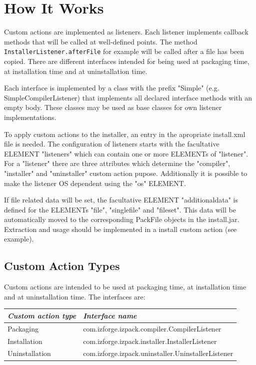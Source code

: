 \section{How It Works}

Custom actions are implemented as listeners. Each listener implements
callback methods that will be called at well-defined points. The method
\texttt{InstallerListener.afterFile} for example will be called after
a file has been copied. There are different interfaces intended for being
used at packaging time, at installation time and at uninstallation time.

Each interface is implemented by a class with the prefix
"Simple" (e.g. SimpleCompilerListener) that implements all declared interface
methods with an empty body. These classes may be used as base classes
for own listener implementations.

To apply custom actions to the installer, an entry in the apropriate
install.xml file is needed. The configuration of listeners starts with
the facultative ELEMENT "listeners" which can contain one or more ELEMENTs
of "listener". For a "listener" there are three attributes which determine the
"compiler", "installer" and "uninstaller" custom action pupose.
Additionally it is possible to make the listener OS dependent using the "os"
ELEMENT.

If file related data will be set, the facultative ELEMENT
"additionaldata" is defined for the ELEMENTs "file", "singlefile"
and "fileset". This data will be automatically moved to the
corresponding PackFile objects in the install.jar. Extraction and
usage should be implemented in a install custom action (see
example).




\subsection{Custom Action Types}

Custom actions are intended to be used at packaging time, at installation time
and at uninstallation time. The interfaces are:
\begin{center}
\begin{tabular}{|l|l|}
\hline \textit{Custom action type} & \textit{Interface name} \\
\hline Packaging & com.izforge.izpack.compiler.CompilerListener \\
\hline
\hline Installation & com.izforge.izpack.installer.InstallerListener \\
\hline
\hline Uninstallation & com.izforge.izpack.uninstaller.UninstallerListener \\
\hline
\end{tabular}\
\end{center}

